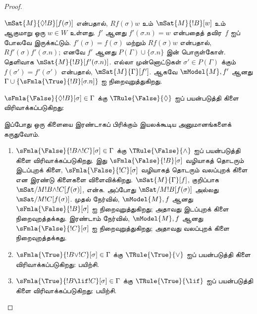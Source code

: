 \documentclass[../../../include/open-logic-section]{subfiles}
\begin{document}
\begin{proof}
\begin{enumerate}
{{  $\mSat{M}{\Diamond !B}[f(\sigma)]$ என்பதால், $Rf(\sigma)w$ உம்
  $\mSat{M}{!B}[w]$ உம் ஆகுமாறு ஒரு $w \in W$ உள்ளது. $f'$ ஆனது
  $f'(\sigma.n) = w$ என்பதைத் தவிர~$f$ ஐப் போலவே இருக்கட்டும்.
  $f'(\sigma) = f(\sigma)$ மற்றும் $Rf(\sigma)w$ என்பதால்,
  $Rf'(\sigma)f'(\sigma.n)$; எனவே $f'$ ஆனது $P(\Gamma) \cup
  \{\sigma.n\}$ இன் பொருள்கோள். தெளிவாக
  $\mSat{M}{!B}[f'(\sigma.n)]$. எல்லா முன்னொட்டுகள் $\sigma' \in
  P(\Gamma)$ க்கும் $f(\sigma') = f'(\sigma')$ என்பதால்,
  $\mSat{M}{\Gamma}[f']$. ஆகவே $\mModel{M}, f'$ ஆனது $\Gamma \cup
  \{\sFmla{\True}{!B}[\sigma.n]\}$ ஐ நிறைவுறுத்துகிறது.}
\item $\sFmla{\False}{\Diamond !B}[\sigma] \in \Gamma$ க்கு
  $\TRule{\False}{\Diamond}$ ஐப் பயன்படுத்தி கிளை விரிவாக்கப்படுகிறது:
  }{}
\end{enumerate}
இப்போது ஒரு கிளையை இரண்டாகப் பிரிக்கும் இயலக்கூடிய அனுமானங்களைக் கருதுவோம்.
\begin{enumerate}
\item $\sFmla{\False}{!B \land !C}[\sigma] \in \Gamma$ க்கு
  $\TRule{\False}{\land}$ ஐப் பயன்படுத்தி கிளை விரிவாக்கப்படுகிறது. இது
  $\sFmla{\False}{!B}[\sigma]$ வழியாகத் தொடரும் இடப்புறக் கிளை,
  $\sFmla{\False}{!C}[\sigma]$ வழியாகத் தொடரும் வலப்புறக் கிளை என இரண்டு
  கிளைகளை விளைவிக்கிறது. $\mSat{M}{\Gamma}[f]$, குறிப்பாக
  $\mSat/{M}{!B \land !C}[f(\sigma)]$, என்க. அப்போது
  $\mSat/{M}{!B}[f(\sigma)]$ அல்லது $\mSat/{M}{!C}[f(\sigma)]$.
  முதல் நேர்வில், $\mModel{M}, f$ ஆனது $\sFmla{\False}{!B}[\sigma]$ ஐ
  நிறைவுறுத்துகிறது; அதாவது இடப்புறக் கிளை நிறைவுறத்தக்கது. இரண்டாம்
  நேர்வில், $\mModel{M}, f$ ஆனது $\sFmla{\False}{!C}[\sigma]$ ஐ
  நிறைவுறுத்துகிறது; அதாவது வலப்புறக் கிளை நிறைவுறத்தக்கது.
\item $\sFmla{\True}{!B \lor !C}[\sigma] \in \Gamma$ க்கு
    $\TRule{\True}{\lor}$ ஐப் பயன்படுத்தி கிளை விரிவாக்கப்படுகிறது:
    பயிற்சி.
\item $\sFmla{\True}{!B \lif !C}[\sigma] \in \Gamma$ க்கு
    $\TRule{\True}{\lif}$ ஐப் பயன்படுத்தி கிளை விரிவாக்கப்படுகிறது:
    பயிற்சி.
\end{enumerate}
\end{proof}
\end{document}
